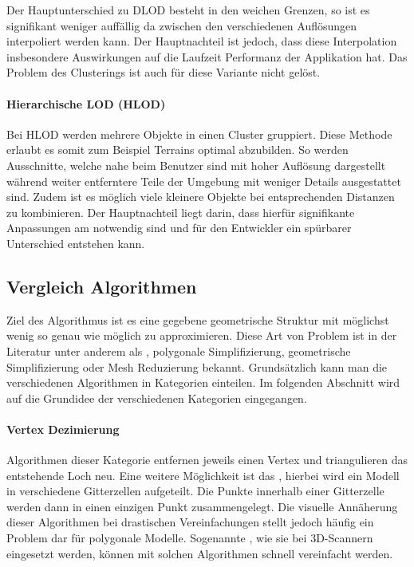 Der Hauptunterschied zu DLOD besteht in den weichen Grenzen, so ist es signifikant weniger auffällig da zwischen den verschiedenen Auflösungen interpoliert werden kann.
Der Hauptnachteil ist jedoch, dass diese Interpolation insbesondere Auswirkungen auf die Laufzeit Performanz der Applikation hat.
Das Problem des Clusterings ist auch für diese Variante nicht gelöst.

\paragraph{Hierarchische LOD (HLOD)}
Bei HLOD werden mehrere Objekte in einen Cluster gruppiert.
Diese Methode erlaubt es somit zum Beispiel Terrains optimal abzubilden. So werden Ausschnitte, welche nahe beim Benutzer sind mit hoher Auflösung dargestellt während weiter entferntere Teile der Umgebung mit weniger Details ausgestattet sind.
Zudem ist es möglich viele kleinere Objekte bei entsprechenden Distanzen zu kombinieren.
Der Hauptnachteil liegt darin, dass hierfür signifikante Anpassungen am  notwendig sind und für den Entwickler ein spürbarer Unterschied entstehen kann.

\subsection{Vergleich Algorithmen}
\label{chap:lodAlgorithmComparison}

Ziel des Algorithmus ist es eine gegebene geometrische Struktur mit möglichst wenig  so genau wie möglich zu approximieren.
Diese Art von Problem ist in der Literatur unter anderem als , polygonale Simplifizierung, geometrische Simplifizierung oder Mesh Reduzierung bekannt.
Grundsätzlich kann man die verschiedenen Algorithmen in Kategorien einteilen.
Im folgenden Abschnitt wird auf die Grundidee der verschiedenen Kategorien eingegangen.

\paragraph{Vertex Dezimierung}
Algorithmen dieser Kategorie entfernen jeweils einen Vertex und triangulieren das entstehende Loch neu.
Eine weitere Möglichkeit ist das , hierbei wird ein Modell in verschiedene Gitterzellen aufgeteilt. Die Punkte innerhalb einer Gitterzelle werden dann in einen einzigen Punkt zusammengelegt. Die visuelle Annäherung dieser Algorithmen bei drastischen Vereinfachungen stellt jedoch häufig ein Problem dar für polygonale Modelle. Sogenannte , wie sie bei 3D-Scannern eingesetzt werden, können mit solchen Algorithmen schnell vereinfacht werden.


